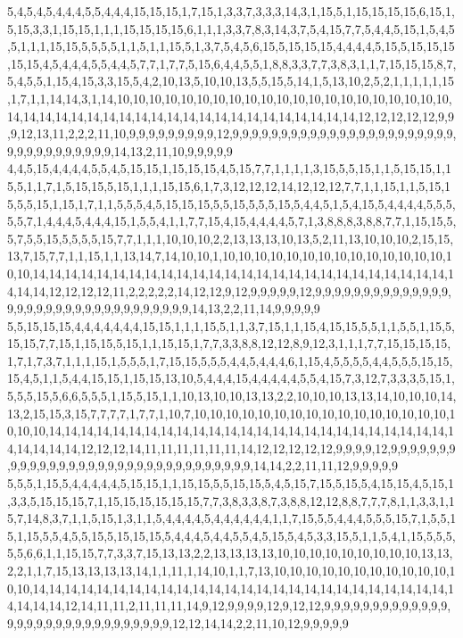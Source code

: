 5,4,5,4,5,4,4,4,5,5,4,4,4,15,15,15,1,7,15,1,3,3,7,3,3,3,14,3,1,15,5,1,15,15,15,15,6,15,1,5,15,3,3,1,15,15,1,1,1,15,15,15,15,6,1,1,1,3,3,7,8,3,14,3,7,5,4,15,7,7,5,4,4,5,15,1,5,4,5,5,1,1,1,15,15,5,5,5,5,1,1,5,1,1,15,5,1,3,7,5,4,5,6,15,5,15,15,15,4,4,4,4,5,15,5,15,15,15,15,15,4,5,4,4,4,5,5,4,4,5,7,7,1,7,7,5,15,6,4,4,5,5,1,8,8,3,3,7,7,3,8,3,1,1,7,15,15,15,8,7,5,4,5,5,1,15,4,15,3,3,15,5,4,2,10,13,5,10,10,13,5,5,15,5,14,1,5,13,10,2,5,2,1,1,1,1,1,15,1,7,1,1,14,14,3,1,14,10,10,10,10,10,10,10,10,10,10,10,10,10,10,10,10,10,10,10,10,10,14,14,14,14,14,14,14,14,14,14,14,14,14,14,14,14,14,14,14,14,14,14,12,12,12,12,12,9,9,9,12,13,11,2,2,2,11,10,9,9,9,9,9,9,9,9,9,12,9,9,9,9,9,9,9,9,9,9,9,9,9,9,9,9,9,9,9,9,9,9,9,9,9,9,9,9,9,9,9,9,9,9,14,13,2,11,10,9,9,9,9,9
4,4,5,15,4,4,4,4,5,5,4,5,15,15,1,15,15,15,4,5,15,7,7,1,1,1,1,3,15,5,5,15,1,1,5,15,15,1,15,5,1,1,7,1,5,15,15,5,15,1,1,1,15,15,6,1,7,3,12,12,12,14,12,12,12,7,7,1,1,15,1,1,5,15,15,5,5,15,1,15,1,7,1,1,5,5,5,4,5,15,15,15,5,5,15,5,5,5,15,5,4,4,5,1,5,4,15,5,4,4,4,4,5,5,5,5,5,7,1,4,4,4,5,4,4,4,15,1,5,5,4,1,1,7,7,15,4,15,4,4,4,4,5,7,1,3,8,8,8,3,8,8,7,7,1,15,15,5,5,7,5,5,15,5,5,5,5,15,7,7,1,1,1,10,10,10,2,2,13,13,13,10,13,5,2,11,13,10,10,10,2,15,15,13,7,15,7,7,1,1,15,1,1,13,14,7,14,10,10,1,10,10,10,10,10,10,10,10,10,10,10,10,10,10,10,10,14,14,14,14,14,14,14,14,14,14,14,14,14,14,14,14,14,14,14,14,14,14,14,14,14,14,14,14,14,12,12,12,12,11,2,2,2,2,2,14,12,12,9,12,9,9,9,9,9,12,9,9,9,9,9,9,9,9,9,9,9,9,9,9,9,9,9,9,9,9,9,9,9,9,9,9,9,9,9,9,9,9,9,14,13,2,2,11,14,9,9,9,9,9
5,5,15,15,15,4,4,4,4,4,4,4,15,15,1,1,1,15,5,1,1,3,7,15,1,1,15,4,15,15,5,5,1,1,5,5,1,15,5,15,15,7,7,15,1,15,15,5,15,1,1,15,15,1,7,7,3,3,8,8,12,12,8,9,12,3,1,1,1,7,7,15,15,15,15,1,7,1,7,3,7,1,1,1,15,1,5,5,5,1,7,15,15,5,5,5,4,4,5,4,4,4,6,1,15,4,5,5,5,5,4,4,5,5,5,15,15,15,4,5,1,1,5,4,4,15,15,1,15,15,13,10,5,4,4,4,15,4,4,4,4,4,5,5,4,15,7,3,12,7,3,3,3,5,15,1,5,5,5,15,5,6,6,5,5,5,1,15,5,15,1,1,10,13,10,10,13,13,2,2,10,10,10,13,13,14,10,10,10,14,13,2,15,15,3,15,7,7,7,7,1,7,7,1,10,7,10,10,10,10,10,10,10,10,10,10,10,10,10,10,10,10,10,10,10,14,14,14,14,14,14,14,14,14,14,14,14,14,14,14,14,14,14,14,14,14,14,14,14,14,14,14,14,14,14,12,12,12,14,11,11,11,11,11,11,14,12,12,12,12,12,9,9,9,9,12,9,9,9,9,9,9,9,9,9,9,9,9,9,9,9,9,9,9,9,9,9,9,9,9,9,9,9,9,9,9,9,9,14,14,2,2,11,11,12,9,9,9,9,9
5,5,5,1,15,5,4,4,4,4,4,5,15,15,1,1,15,15,5,5,15,15,5,4,5,15,7,15,5,15,5,4,15,15,4,5,15,1,3,3,5,15,15,15,7,1,15,15,15,15,15,15,7,7,3,8,3,3,8,7,3,8,8,12,12,8,8,7,7,7,8,1,1,3,3,1,15,7,14,8,3,7,1,1,5,15,1,3,1,1,5,4,4,4,4,5,4,4,4,4,4,4,1,1,7,15,5,5,4,4,4,5,5,5,15,7,1,5,5,15,1,15,5,5,4,5,5,15,5,15,15,15,5,4,4,4,5,4,4,5,5,4,5,15,5,4,5,3,3,15,5,1,1,5,4,1,15,5,5,5,5,5,6,6,1,1,15,15,7,7,3,3,7,15,13,13,2,2,13,13,13,13,10,10,10,10,10,10,10,10,10,13,13,2,2,1,1,7,15,13,13,13,13,14,1,1,11,1,14,10,1,1,7,13,10,10,10,10,10,10,10,10,10,10,10,10,10,14,14,14,14,14,14,14,14,14,14,14,14,14,14,14,14,14,14,14,14,14,14,14,14,14,14,14,14,14,14,12,14,11,11,2,11,11,11,14,9,12,9,9,9,9,12,9,12,12,9,9,9,9,9,9,9,9,9,9,9,9,9,9,9,9,9,9,9,9,9,9,9,9,9,9,9,9,9,9,12,12,14,14,2,2,11,10,12,9,9,9,9,9
